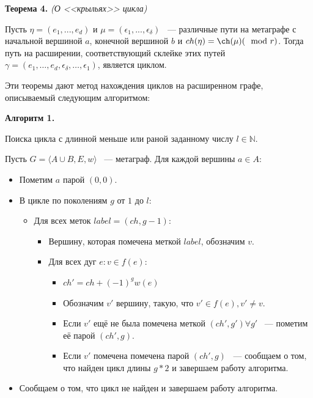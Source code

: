 \documentclass[14pt]{mmcs-article}
\begin{document}
\textbf{Теорема 4.} \textsl{(О <<крыльях>> цикла)}

Пусть $\eta = (e_1, ..., e_d)$ и $\mu = (\epsilon_1, ..., \epsilon_{\delta})$ ~--- различные пути на метаграфе с начальной вершиной $a$, конечной вершиной $b$ и $ch(\eta) = \ch(\mu) (\mod{r})$. Тогда путь на расширении, соответствующий склейке этих путей $\gamma = (e_1, \dots, e_d, \epsilon_{\delta}, \dots, \epsilon_1)$, является циклом.

Эти теоремы дают метод нахождения циклов на расширенном графе, описываемый следующим алгоритмом:

\textbf{Алгоритм 1.}


Поиска цикла с длинной меньше или раной заданному числу $l \in \mathbb{N}$.

Пусть $G = \langle A \cup B, E,w\rangle$ ~--- метаграф. Для каждой вершины $a \in A:$

\begin{itemize}
    \item Пометим $a$ парой $(0, 0)$.
    \item В цикле по поколениям $g$ от $1$ до $l$:
      \begin{itemize}
      \item Для всех меток $label = (ch, g - 1)$:
        \begin{itemize}
        \item Вершину, которая помечена меткой $label$, обозначим $v$.
        \item Для всех дуг $e: v \in f(e)$:
          \begin{itemize}
          \item $ch' = ch + (-1)^{g} w(e)$
          \item Обозначим $v'$ вершину, такую, что $v' \in f(e), v' \neq v$.
          \item Если $v'$ ещё не была помечена меткой $(ch', g') \forall g'$ ~--- пометим её парой $(ch', g)$.
          \item Если $v'$ помечена помечена парой $(ch', g)$ ~--- сообщаем о том, что найден цикл длины $g * 2$ и завершаем работу алгоритма.
          \end{itemize}
        \end{itemize}
      \end{itemize}
    \item Сообщаем о том, что цикл не найден и завершаем работу алгоритма.
\end{itemize}
\end{document}
